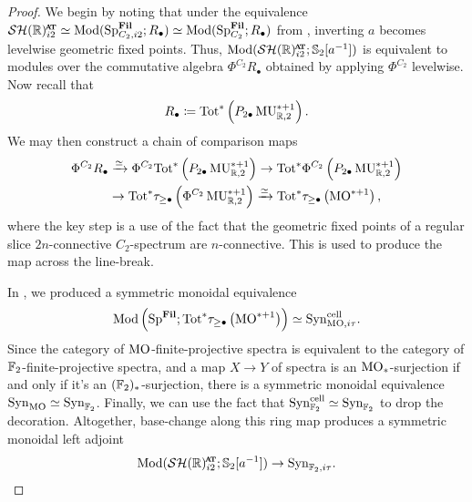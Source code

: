 \begin{proof}
  We begin by noting that under the equivalence
  $ \SHRat \simeq \Mod(\Sp_{C_2, i2} ^{\Fil}; R_\bullet) \simeq \Mod(\Sp_{C_2} ^{\Fil}; R_\bullet)$ from ,
  inverting $a$ becomes levelwise geometric fixed points.
  Thus, $\Mod(\SHRat; \Ss_2 [a^{-1}])$ is equivalent to modules over the commutative algebra $\Phi^{C_2}R_\bullet$ %
  obtained by applying $\Phi^{C_2}$ levelwise. %
  Now recall that
  \[ R_\bullet \coloneqq \mathrm{Tot}^* \left( P_{2\bullet} \operatorname{\mathrm{MU}}_{\mathbb{R},2}^{* + 1} \right). \]
  We may then construct a chain of comparison maps
  \begin{align*}
    \Phi^{C_2} R_\bullet &\xrightarrow{\simeq}
    \Phi^{C_2} \mathrm{Tot}^* \left( P_{2\bullet} \operatorname{\mathrm{MU}}_{\mathbb{R},2}^{* + 1} \right) \to
    \mathrm{Tot}^{*} \Phi ^{C_2} \left( P_{2\bullet} \operatorname{\mathrm{MU}}_{\mathbb{R},2}^{* + 1} \right) \\
    &\to \mathrm{Tot}^{*} \tau_{\geq \bullet} \left( \Phi^{C_2}  \operatorname{\mathrm{MU}}_{\mathbb{R},2}^{* + 1} \right) \xrightarrow{\simeq}
    \mathrm{Tot}^{*} \tau_{\geq \bullet} \left( \operatorname{\mathrm{MO}}^{* + 1} \right),
  \end{align*}
  where the key step is a use of the fact that 
  the geometric fixed points of a regular slice $2n$-connective $C_2$-spectrum are $n$-connective.
  This is used to produce the map across the line-break.

  In , we produced a symmetric monoidal equivalence
  \[\mathrm{Mod} \left(\operatorname{\mathrm{Sp}}^{\operatorname{\mathbf{Fil}}} ; \mathrm{Tot}^{*} \tau_{\geq \bullet} \left( \operatorname{\mathrm{MO}}^{* + 1} \right) \right) \simeq \mathrm{Syn}^{\mathrm{cell}}_{\operatorname{\mathrm{MO}}, i\tau}.\]
  Since the category of $\operatorname{\mathrm{MO}}$-finite-projective spectra is equivalent to the category of $\operatorname{\mathbb{F}}_2$-finite-projective spectra, and a map $X \to Y$ of spectra is an $\operatorname{\mathrm{MO}}_*$-surjection if and only if it's an $(\operatorname{\mathbb{F}}_2)_*$-surjection, there is a symmetric monoidal equivalence $\mathrm{Syn}_{\operatorname{\mathrm{MO}}} \simeq \mathrm{Syn}_{\operatorname{\mathbb{F}}_2}$. Finally, we can use the fact that $\mathrm{Syn}_{\operatorname{\mathbb{F}}_2}^{\mathrm{cell}} \simeq \mathrm{Syn}_{\operatorname{\mathbb{F}}_2}$ to drop the decoration. Altogether, base-change along this ring map produces a symmetric monoidal left adjoint
  \[ \mathrm{Mod}( \SHRat ; \Ss_2 [a^{-1}] ) \to \Syn_{\F_2, i\tau}. \qedhere \]
     

\end{proof}
